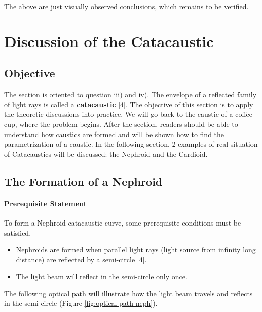 \documentclass[a4paper]{article}
\begin{document}
The above are just visually observed conclusions, which remains to be verified.
\section{Discussion of the Catacaustic}
\subsection{Objective}
The section is oriented to question iii) and iv). The envelope of a reflected family of light rays is called a \textbf{catacaustic} [4]. The objective of this section is to apply the theoretic discussions into practice. We will go back to the caustic of a coffee cup, where the problem begins. After the section, readers should be able to understand how caustics are formed and will be shown how to find the parametrization of a caustic. In the following section, 2 examples of real situation of Catacaustics will be discussed: the Nephroid and the Cardioid.
\subsection{The Formation of a Nephroid}
\paragraph{Prerequisite Statement}
To form a Nephroid catacaustic curve, some prerequisite conditions must be satisfied.
\begin{itemize}
\item Nephroids are formed when parallel light rays (light source from infinity long distance) are reflected by a semi-circle [4].
\item The light beam will reflect in the semi-circle only once.
\end{itemize}

The following optical path will illustrate how the light beam travels and reflects in the semi-circle (Figure \ref{fig:optical path neph}).
\end{document}
